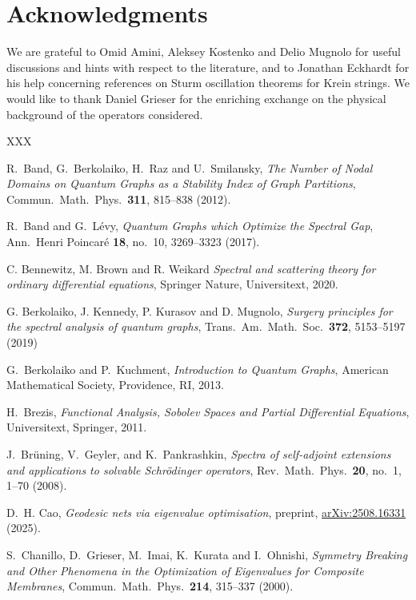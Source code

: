 \documentclass[reqno]{amsart}
\newcommand{\arxiv}[1]{\href{http://arxiv.org/abs/#1}{arXiv:#1}}
\theoremstyle{plain}
\theoremstyle{definition}
\theoremstyle{remark}
\numberwithin{equation}{section}
\newcommand{\ack}{\section*{Acknowledgments}}
\begin{document}
\ack{We are grateful to Omid Amini, Aleksey Kostenko and Delio Mugnolo for useful discussions and hints with respect to the literature, and to Jonathan Eckhardt for his help concerning references on Sturm oscillation theorems for Krein strings. We would like to thank Daniel Grieser for the enriching exchange on the physical background of the operators considered.} 



\begin{thebibliography}{XXX}

	
	
	R.\ Band, G.\ Berkolaiko, H.\ Raz and U.\ Smilansky, {\em The Number of Nodal Domains on Quantum Graphs as a Stability Index of Graph Partitions}, Commun.\ Math.\ Phys.\ \textbf{311}, 815--838 (2012).
	
	R.\ Band and G.\ Lévy, {\em Quantum Graphs which Optimize the Spectral Gap}, Ann.\ Henri Poincar\'e {\bf 18}, no.~10, 3269--3323 (2017).
	
	C. Bennewitz, M. Brown and R. Weikard {\em Spectral and scattering theory for ordinary differential equations}, Springer Nature, Universitext, 2020.

	
	G. Berkolaiko, J. Kennedy, P. Kurasov and D. Mugnolo, {\em Surgery principles for the spectral analysis of quantum graphs}, Trans.\ Am.\ Math.\ Soc.\ \textbf{372}, 5153--5197 (2019)
	
	
	G.\ Berkolaiko and P.\ Kuchment, {\em Introduction to Quantum Graphs}, American Mathematical Society, Providence, RI, 2013.
	
	
	H.\ Brezis, {\em Functional Analysis, Sobolev Spaces and Partial Differential Equations}, Universitext, Springer, 2011.
	
	J.\ Brüning, V.\ Geyler, and K.\ Pankrashkin, {\em Spectra of self-adjoint extensions and applications to solvable Schrödinger operators}, Rev.\ Math.\ Phys.\ \textbf{20}, no.~1, 1--70 (2008).	
	
	
	D.\ H. Cao, {\em Geodesic nets via eigenvalue optimisation}, preprint, \arxiv{2508.16331} (2025).
	
	
	S.\ Chanillo, D.\ Grieser, M.\ Imai, K.\ Kurata and I.\ Ohnishi, {\em Symmetry Breaking and Other Phenomena in the Optimization of Eigenvalues for Composite Membranes}, Commun.\ Math.\ Phys.\ \textbf{214}, 315--337 (2000). 
	

\end{thebibliography}
\end{document}
